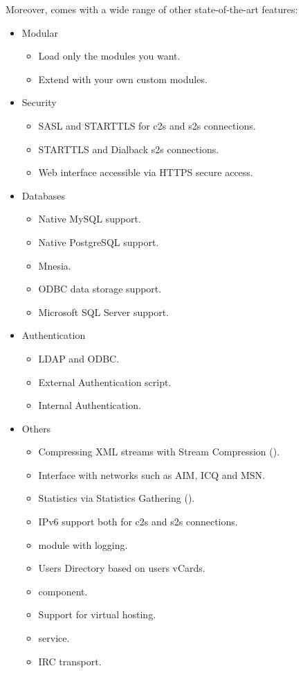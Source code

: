 Moreover, \ejabberd{} comes with a wide range of other state-of-the-art features:
\begin{itemize}
\item Modular
\begin{itemize}
\item Load only the modules you want.
\item Extend \ejabberd{} with your own custom modules.
\end{itemize}
\item Security
\begin{itemize}
\item SASL and STARTTLS for c2s and s2s connections.
\item STARTTLS and Dialback s2s connections.
\item Web interface accessible via HTTPS secure access.
\end{itemize}
\item Databases
\begin{itemize}
\item Native MySQL support.
\item Native PostgreSQL support.
\item Mnesia.
\item ODBC data storage support.
\item Microsoft SQL Server support.\new{}
\end{itemize}
\item Authentication
\begin{itemize}
\item LDAP and ODBC.
\item External Authentication script.
\item Internal Authentication.
\end{itemize}
\item Others
\begin{itemize}
\item Compressing XML streams with Stream Compression ().
\item Interface with networks such as AIM, ICQ and MSN.
\item Statistics via Statistics Gathering ().
\item IPv6 support both for c2s and s2s connections.
\item {} module with logging.\improved{}
\item Users Directory based on users vCards.
\item {} component.
\item Support for virtual hosting.
\item {} service.
\item IRC transport.
\end{itemize}
\end{itemize}